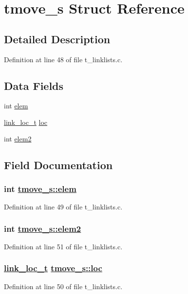 \hypertarget{structtmove__s}{
\section{tmove\_\-s Struct Reference}
\label{structtmove__s}
}


\subsection{Detailed Description}




Definition at line 48 of file t\_\-linklists.c.\subsection*{Data Fields}
\begin{CompactItemize}
\item 
int \hyperlink{structtmove__s_o0}{elem}
\item 
\hyperlink{group__dbprim__link_ga4}{link\_\-loc\_\-t} \hyperlink{structtmove__s_o1}{loc}
\item 
int \hyperlink{structtmove__s_o2}{elem2}
\end{CompactItemize}


\subsection{Field Documentation}
\hypertarget{structtmove__s_o0}{
\subsubsection[elem]{\setlength{\rightskip}{0pt plus 5cm}int \hyperlink{structtmove__s_o0}{tmove\_\-s::elem}}}
\label{structtmove__s_o0}




Definition at line 49 of file t\_\-linklists.c.\hypertarget{structtmove__s_o2}{
\subsubsection[elem2]{\setlength{\rightskip}{0pt plus 5cm}int \hyperlink{structtmove__s_o2}{tmove\_\-s::elem2}}}
\label{structtmove__s_o2}




Definition at line 51 of file t\_\-linklists.c.\hypertarget{structtmove__s_o1}{
\subsubsection[loc]{\setlength{\rightskip}{0pt plus 5cm}\hyperlink{group__dbprim__link_ga4}{link\_\-loc\_\-t} \hyperlink{structtmove__s_o1}{tmove\_\-s::loc}}}
\label{structtmove__s_o1}




Definition at line 50 of file t\_\-linklists.c.
